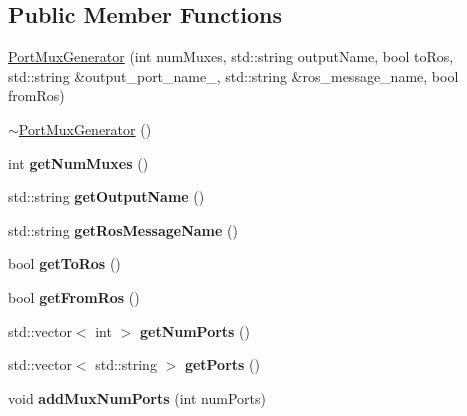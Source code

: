 \subsection*{Public Member Functions}
\begin{DoxyCompactItemize}
\item 
\hyperlink{classPortMuxGenerator_a88f5396d5f7564ad04d74d0184ab6e83}{Port\-Mux\-Generator} (int num\-Muxes, std\-::string output\-Name, bool to\-Ros, std\-::string \&output\-\_\-port\-\_\-name\-\_\-, std\-::string \&ros\-\_\-message\-\_\-name, bool from\-Ros)
\item 
\hyperlink{classPortMuxGenerator_afb0616d1f35b218b08f9482a30322d32}{$\sim$\-Port\-Mux\-Generator} ()
\item 
\hypertarget{classPortMuxGenerator_ade9b337018f7e2794efb4ec69f790af1}{int {\bfseries get\-Num\-Muxes} ()}\label{classPortMuxGenerator_ade9b337018f7e2794efb4ec69f790af1}

\item 
\hypertarget{classPortMuxGenerator_aa92143f0290965c23e1f727ad0aea5e1}{std\-::string {\bfseries get\-Output\-Name} ()}\label{classPortMuxGenerator_aa92143f0290965c23e1f727ad0aea5e1}

\item 
\hypertarget{classPortMuxGenerator_a6dc487c1749d7af1e22a0f738dab9705}{std\-::string {\bfseries get\-Ros\-Message\-Name} ()}\label{classPortMuxGenerator_a6dc487c1749d7af1e22a0f738dab9705}

\item 
\hypertarget{classPortMuxGenerator_a1ba37b470422d906d9aa287524548fd5}{bool {\bfseries get\-To\-Ros} ()}\label{classPortMuxGenerator_a1ba37b470422d906d9aa287524548fd5}

\item 
\hypertarget{classPortMuxGenerator_a150ec5e8d2b45896a22c37e967a5bdc9}{bool {\bfseries get\-From\-Ros} ()}\label{classPortMuxGenerator_a150ec5e8d2b45896a22c37e967a5bdc9}

\item 
\hypertarget{classPortMuxGenerator_a432c713e00d15a0f330c2811887ca8ff}{std\-::vector$<$ int $>$ {\bfseries get\-Num\-Ports} ()}\label{classPortMuxGenerator_a432c713e00d15a0f330c2811887ca8ff}

\item 
\hypertarget{classPortMuxGenerator_aa1c438d531d3e3418f135d6c7041279d}{std\-::vector$<$ std\-::string $>$ {\bfseries get\-Ports} ()}\label{classPortMuxGenerator_aa1c438d531d3e3418f135d6c7041279d}

\item 
\hypertarget{classPortMuxGenerator_a956196e2654ec5e7958a9cb98bde7a9b}{void {\bfseries add\-Mux\-Num\-Ports} (int num\-Ports)}\label{classPortMuxGenerator_a956196e2654ec5e7958a9cb98bde7a9b}


\end{DoxyCompactItemize}

